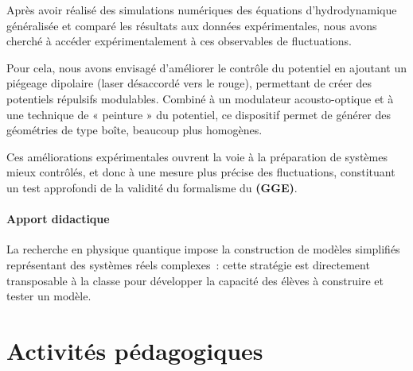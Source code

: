 Après avoir réalisé des simulations numériques des équations d’hydrodynamique
généralisée et comparé les résultats aux données expérimentales, nous avons
cherché à accéder expérimentalement à ces observables de fluctuations.

Pour cela, nous avons envisagé d’améliorer le contrôle du potentiel en ajoutant
un piégeage dipolaire (laser désaccordé vers le rouge), permettant de créer des
potentiels répulsifs modulables. Combiné à un modulateur acousto-optique et à
une technique de « peinture » du potentiel, ce dispositif permet de générer des
géométries de type boîte, beaucoup plus homogènes.

Ces améliorations expérimentales ouvrent la voie à la préparation de systèmes
mieux contrôlés, et donc à une mesure plus précise des fluctuations,
constituant un test approfondi de la validité du formalisme du {\bf
        \textsf{(GGE)}}.

\vspace{-0.5cm}

\paragraph{Apport didactique}
La recherche en physique quantique impose la construction de modèles simplifiés
représentant des systèmes réels complexes : cette stratégie est directement
transposable à la classe pour développer la capacité des élèves à construire et
tester un modèle.

\section{Activités pédagogiques}



